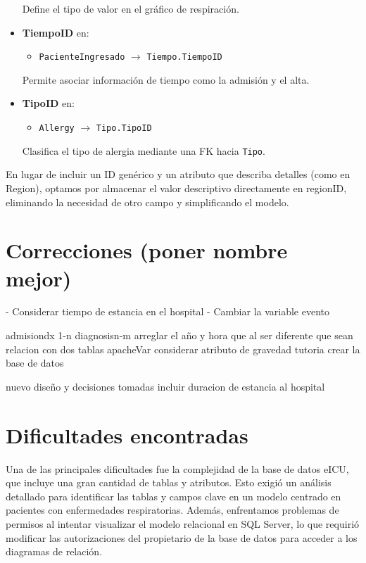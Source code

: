 \documentclass[12pt, a4paper, twoside]{article}
\begin{document}
\begin{itemize}
		Define el tipo de valor en el gráfico de respiración.
		
		\item \textbf{TiempoID} en:
		\begin{itemize}
			\item \texttt{PacienteIngresado} $\rightarrow$ \texttt{Tiempo.TiempoID}
		\end{itemize}
		
		Permite asociar información de tiempo como la admisión y el alta.
		
		\item \textbf{TipoID} en:
		\begin{itemize}
			\item \texttt{Allergy} $\rightarrow$ \texttt{Tipo.TipoID}
		\end{itemize}
		
		Clasifica el tipo de alergia mediante una FK hacia \texttt{Tipo}.
		
	\end{itemize}
	
	
	En lugar de incluir un ID genérico y un atributo que describa detalles (como en Region), optamos por almacenar el valor descriptivo directamente en regionID, eliminando la necesidad de otro campo y simplificando el modelo.
	
	
	\section{Correcciones (poner nombre mejor)}
	
	- Considerar tiempo de estancia en el hospital
	- Cambiar la variable evento
	
	
	admisiondx 1-n
	diagnosisn-m
	arreglar el año y hora que al ser diferente que sean relacion con dos tablas
	apacheVar considerar atributo de gravedad
	tutoria crear la base de datos
	
	
	nuevo diseño y decisiones tomadas
	incluir duracion de estancia al hospital
	
	
	\section{Dificultades encontradas}
	
	
	Una de las principales dificultades fue la complejidad de la base de datos eICU, que incluye una gran cantidad de tablas y atributos. Esto exigió un análisis detallado para identificar las tablas y campos clave en un modelo centrado en pacientes con enfermedades respiratorias. Además, enfrentamos problemas de permisos al intentar visualizar el modelo relacional en SQL Server, lo que requirió modificar las autorizaciones del propietario de la base de datos para acceder a los diagramas de relación.
	
\end{document}
